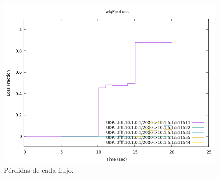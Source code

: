\documentclass[11pt]{article}
\begin{document}
            \begin{figure}
                \centering
                \includegraphics[width=0.6\linewidth]{wfqPrioLoss.png}
                \caption{Pérdidas de cada flujo.}
                \label{fig:wfqPrioLoss}
            \end{figure}
\end{document}
